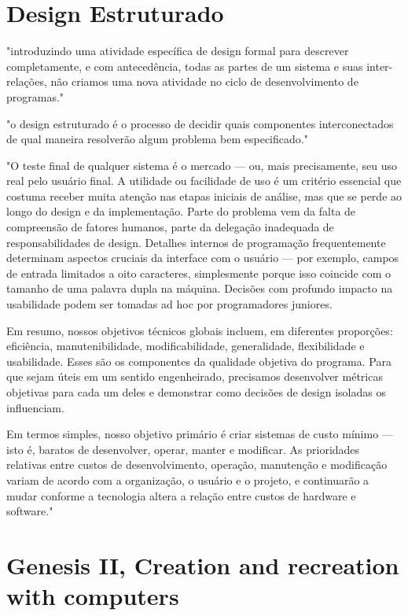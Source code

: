 \documentclass[12pt,a4paper]{article}
\begin{document}
\section{Design Estruturado}
\textcite{yourdon1979structured} 

"introduzindo uma atividade específica de design formal para descrever completamente, e com antecedência, todas as partes de um sistema e suas inter-relações, não criamos uma nova atividade no ciclo de desenvolvimento de programas." 

"o design estruturado é o processo de decidir quais componentes interconectados de qual maneira resolverão algum problema bem especificado."

"O teste final de qualquer sistema é o mercado — ou, mais precisamente, seu uso real pelo usuário final.
A utilidade ou facilidade de uso é um critério essencial que costuma receber muita atenção nas etapas iniciais de análise, mas que se perde ao longo do design e da implementação.
Parte do problema vem da falta de compreensão de fatores humanos, parte da delegação inadequada de responsabilidades de design.
Detalhes internos de programação frequentemente determinam aspectos cruciais da interface com o usuário — por exemplo, campos de entrada limitados a oito caracteres, simplesmente porque isso coincide com o tamanho de uma palavra dupla na máquina.
Decisões com profundo impacto na usabilidade podem ser tomadas ad hoc por programadores juniores.

Em resumo, nossos objetivos técnicos globais incluem, em diferentes proporções:
eficiência, manutenibilidade, modificabilidade, generalidade, flexibilidade e usabilidade.
Esses são os componentes da qualidade objetiva do programa.
Para que sejam úteis em um sentido engenheirado, precisamos desenvolver métricas objetivas para cada um deles e demonstrar como decisões de design isoladas os influenciam.

Em termos simples, nosso objetivo primário é criar sistemas de custo mínimo — isto é, baratos de desenvolver, operar, manter e modificar.
As prioridades relativas entre custos de desenvolvimento, operação, manutenção e modificação variam de acordo com a organização, o usuário e o projeto, e continuarão a mudar conforme a tecnologia altera a relação entre custos de hardware e software."

\section{Genesis II, Creation and recreation with computers}
\textcite{peterson1983genesis} 
\end{document}
